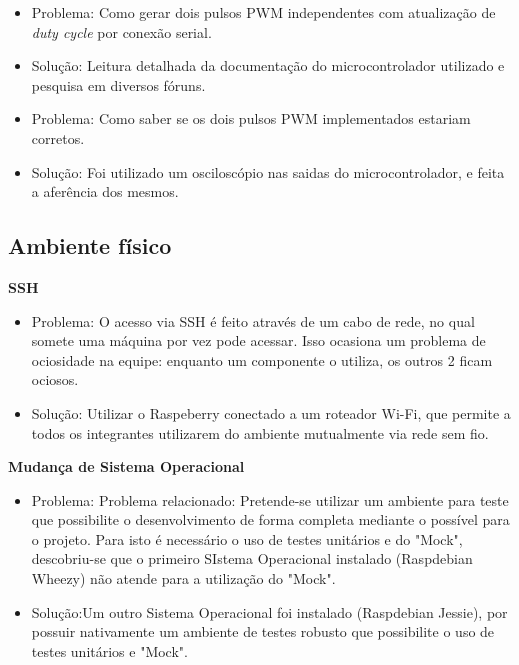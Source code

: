  \begin{itemize}
    \item Problema: Como gerar dois pulsos PWM independentes com atualização de \textit{duty cycle} por conexão serial.
    \item Solução: Leitura detalhada da documentação do microcontrolador utilizado e pesquisa em diversos fóruns.
\end{itemize}

\begin{itemize}
   \item Problema: Como saber se os dois pulsos PWM implementados estariam corretos.
   \item Solução: Foi utilizado um osciloscópio nas saidas do microcontrolador, e feita a aferência dos mesmos.
\end{itemize}

\subsection{Ambiente físico}
 \textbf{SSH}

 \begin{itemize}
    \item Problema:  O acesso via SSH é feito através de um cabo de rede, no qual somete uma máquina por vez pode acessar. Isso ocasiona um problema de ociosidade na equipe: enquanto um componente o utiliza, os outros 2 ficam ociosos.
	  \item Solução: Utilizar o Raspeberry conectado a um roteador Wi-Fi, que permite a todos os integrantes utilizarem do ambiente mutualmente via rede sem fio.
    \end{itemize}

  \textbf{Mudança de Sistema Operacional}

 \begin{itemize}
    \item Problema:  Problema relacionado: Pretende-se utilizar um ambiente para teste que possibilite o desenvolvimento de forma completa mediante o possível para o projeto. Para isto é necessário o uso de testes unitários e do "Mock", descobriu-se que o primeiro SIstema Operacional instalado (Raspdebian Wheezy) não atende para a utilização do "Mock".
	  \item Solução:Um outro Sistema Operacional foi instalado (Raspdebian Jessie), por possuir nativamente um ambiente de testes robusto que possibilite o uso de testes unitários e "Mock".
    \end{itemize}

